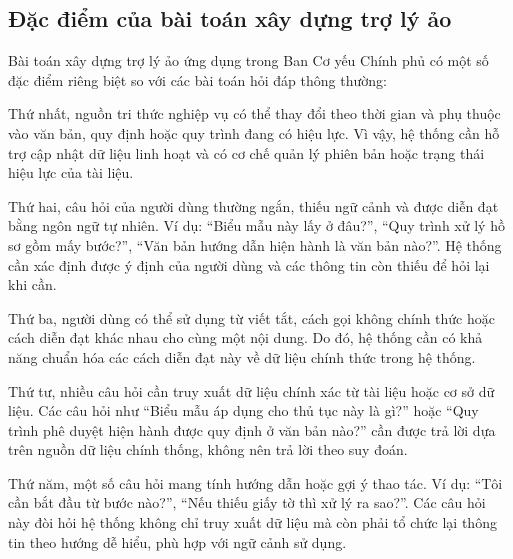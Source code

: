 \subsection{Đặc điểm của bài toán xây dựng trợ lý ảo}

Bài toán xây dựng trợ lý ảo ứng dụng trong Ban Cơ yếu Chính phủ có một số đặc điểm riêng biệt so với các bài toán hỏi đáp thông thường:

Thứ nhất, nguồn tri thức nghiệp vụ có thể thay đổi theo thời gian và phụ thuộc vào văn bản, quy định hoặc quy trình đang có hiệu lực. Vì vậy, hệ thống cần hỗ trợ cập nhật dữ liệu linh hoạt và có cơ chế quản lý phiên bản hoặc trạng thái hiệu lực của tài liệu.

Thứ hai, câu hỏi của người dùng thường ngắn, thiếu ngữ cảnh và được diễn đạt bằng ngôn ngữ tự nhiên. Ví dụ: ``Biểu mẫu này lấy ở đâu?'', ``Quy trình xử lý hồ sơ gồm mấy bước?'', ``Văn bản hướng dẫn hiện hành là văn bản nào?''. Hệ thống cần xác định được ý định của người dùng và các thông tin còn thiếu để hỏi lại khi cần.

Thứ ba, người dùng có thể sử dụng từ viết tắt, cách gọi không chính thức hoặc cách diễn đạt khác nhau cho cùng một nội dung. Do đó, hệ thống cần có khả năng chuẩn hóa các cách diễn đạt này về dữ liệu chính thức trong hệ thống.

Thứ tư, nhiều câu hỏi cần truy xuất dữ liệu chính xác từ tài liệu hoặc cơ sở dữ liệu. Các câu hỏi như ``Biểu mẫu áp dụng cho thủ tục này là gì?'' hoặc ``Quy trình phê duyệt hiện hành được quy định ở văn bản nào?'' cần được trả lời dựa trên nguồn dữ liệu chính thống, không nên trả lời theo suy đoán.

Thứ năm, một số câu hỏi mang tính hướng dẫn hoặc gợi ý thao tác. Ví dụ: ``Tôi cần bắt đầu từ bước nào?'', ``Nếu thiếu giấy tờ thì xử lý ra sao?''. Các câu hỏi này đòi hỏi hệ thống không chỉ truy xuất dữ liệu mà còn phải tổ chức lại thông tin theo hướng dễ hiểu, phù hợp với ngữ cảnh sử dụng.

